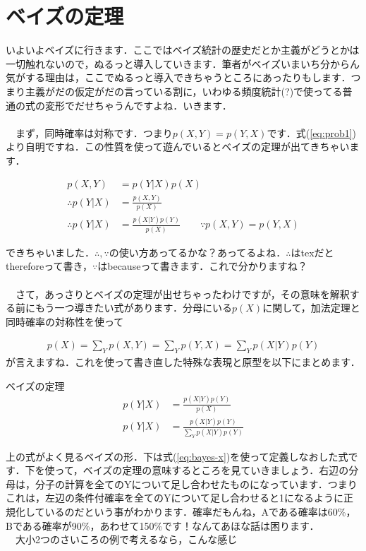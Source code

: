 \documentclass[11pt,a4paper,uplatex]{ujreport} 	%
\begin{document}
\section{ベイズの定理}
いよいよベイズに行きます．ここではベイズ統計の歴史だとか主義がどうとかは一切触れないので，ぬるっと導入していきます．筆者がベイズいまいち分からん気がする理由は，ここでぬるっと導入できちゃうところにあったりもします．つまり主義がだの仮定がだの言っている割に，いわゆる頻度統計(?)で使ってる普通の式の変形でだせちゃうんですよね．いきます．\\
\\
　まず，同時確率は対称です．つまり$p(X,Y) = p(Y,X)$です．式(\ref{eq:prob1})より自明ですね．この性質を使って遊んでいるとベイズの定理が出てきちゃいます．

\begin{align}
\label{eq:bayes}
p(X, Y) &= p(Y|X)p(X)　\\
\therefore p(Y|X) &= \frac{p(X,Y)}{p(X)}  \\
\therefore p(Y|X) &= \frac{p(X|Y)p(Y)}{p(X)} \qquad \because p(X,Y) = p(Y, X)
\end{align}

できちゃいました．$\therefore, \because$の使い方あってるかな？あってるよね．$\therefore$はtexだとthereforeって書き，$\because$はbecauseって書きます．これで分かりますね？\\
\\
　さて，あっさりとベイズの定理が出せちゃったわけですが，その意味を解釈する前にもう一つ導きたい式があります．分母にいる$p(X)$に関して，加法定理と同時確率の対称性を使って

\begin{align}
\label{eq:bayes-x}
p(X) = \sum_Y p(X,Y) = \sum_Y p(Y,X) = \sum_Y p(X|Y)p(Y)
\end{align}
が言えますね．これを使って書き直した特殊な表現と原型を以下にまとめます．

\begin{screen}
ベイズの定理
\begin{align}
p(Y|X) &= \frac{p(X|Y)p(Y)}{p(X)}\\
p(Y|X) &= \frac{p(X|Y)p(Y)}{\sum_Y p(X|Y)p(Y)}
\end{align}
\end{screen}

上の式がよく見るベイズの形．下は式(\ref{eq:bayes-x})を使って定義しなおした式です．下を使って，ベイズの定理の意味するところを見ていきましょう．右辺の分母は，分子の計算を全てのYについて足し合わせたものになっています．つまりこれは，左辺の条件付確率を全てのYについて足し合わせると1になるように正規化しているのだという事がわかります．確率だもんね，Aである確率は60\%，Bである確率が90\%，あわせて150\%です！なんてあほな話は困ります．\\
　大小2つのさいころの例で考えるなら，こんな感じ
\end{document}
